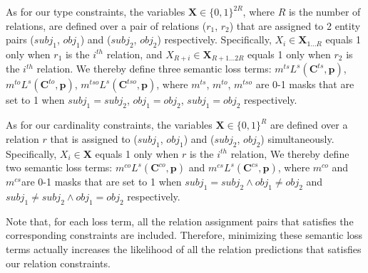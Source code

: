 As for our type constraints, the variables $\bm{X}\in \{0,1\}^{2R}$, where $R$ is the number of relations,
are defined over a pair of  relations ($r_1$, $r_2$) that are assigned to 2 entity pairs ($subj_1$, $obj_1$) and ($subj_2$, $obj_2$) respectively.
Specifically, $X_i\in \bm{X}_{1...R}$ equals 1 only when $r_1$ is the $i^{th}$ relation,
and $X_{R+i}\in \bm{X}_{R+1...2R}$ equals 1 only when $r_2$ is the $i^{th}$ relation.
We thereby define three semantic loss terms: $m^{ts}L^{s}(\bm{C}^{ts}, \bm{p})$, $m^{to}L^{s}(\bm{C}^{to}, \bm{p})$, $m^{tso}L^{s}(\bm{C}^{tso}, \bm{p})$, where $m^{ts}$, $m^{to}$, $m^{tso}$ are 0-1 masks that are set to 1 when $subj_1=subj_2$, $obj_1=obj_2$, $subj_1=obj_2$ respectively.


As for our cardinality constraints, the variables $\bm{X}\in \{0,1\}^{R}$ are defined over a relation $r$ that is assigned to ($subj_1$, $obj_1$) and ($subj_2$, $obj_2$) simultaneously.
Specifically, $X_i\in \bm{X}$ equals 1 only when $r$ is the $i^{th}$ relation,
We thereby define two semantic loss terms: $m^{co}L^{s}(\bm{C}^{co}, \bm{p})$ and $m^{cs}L^{s}(\bm{C}^{cs}, \bm{p})$, where $m^{co}$ and $m^{cs}$are 0-1 masks that are set to 1 when $subj_1=subj_2 \land obj_1\neq obj_2$ and $subj_1\neq subj_2 \land obj_1=obj_2$ respectively.

Note that, for each loss term, all the relation assignment pairs that satisfies the corresponding constraints are included.
Therefore, minimizing these semantic loss terms actually increases the likelihood of all the relation predictions that satisfies our relation constraints.



